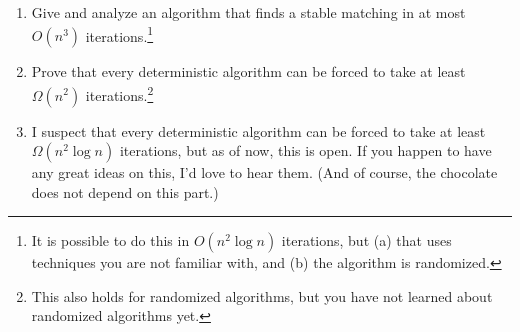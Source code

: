 \documentclass[10pt]{article}
\begin{document}
\begin{enumerate}
\item Give and analyze an algorithm that finds a stable matching in at most $O(n^3)$ iterations.\footnote{It is possible to do this in $O(n^2 \log n)$ iterations, but (a) that uses techniques you are not familiar with, and (b) the algorithm is randomized.}
\item Prove that every deterministic algorithm can be forced to take at least $\Omega(n^2)$ iterations.\footnote{This also holds for randomized algorithms, but you have not learned about randomized algorithms yet.}
\item I suspect that every deterministic algorithm can be forced to take at least $\Omega(n^2 \log n)$ iterations, but as of now, this is open. If you happen to have any great ideas on this, I'd love to hear them. (And of course, the chocolate does not depend on this part.)
\end{enumerate}
\end{document}

